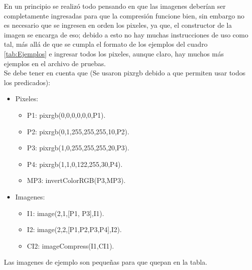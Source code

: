 En un principio se realizó todo pensando en que las imagenes deberían ser completamente ingresadas para que la compresión
funcione  bien, sin embargo no es necesario que se ingresen en orden los pixeles, ya que, el constructor de la imagen se 
encarga de eso; debido a esto no hay muchas instrucciones de uso como tal, más allá de que se cumpla el formato 
de los ejemplos del cuadro \ref{tab:Ejemplos} e ingresar todos los pixeles, aunque claro, 
hay muchos más ejemplos en el archivo de pruebas.\\

Se debe tener en cuenta que (Se usaron pixrgb debido a que permiten usar todos los predicados):

\begin{itemize}
    \item Pixeles:
    \begin{itemize}
        \item P1: pixrgb(0,0,0,0,0,0,P1).
        \item P2: pixrgb(0,1,255,255,255,10,P2).
        \item P3: pixrgb(1,0,255,255,255,20,P3).
        \item P4: pixrgb(1,1,0,122,255,30,P4).
        \item MP3: invertColorRGB(P3,MP3).
    \end{itemize}
    \item Imagenes:
    \begin{itemize}
        \item I1: image(2,1,[P1, P3],I1).
        \item I2: image(2,2,[P1,P2,P3,P4],I2).
        \item CI2: imageCompress(I1,CI1).
    \end{itemize}
\end{itemize}

Las imagenes de ejemplo son pequeñas para que quepan en la tabla.